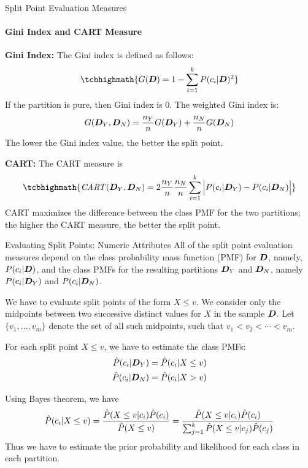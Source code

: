 \begin{frame}{Split Point Evaluation Measures}
\framesubtitle{Gini Index and CART Measure}

{\bf Gini Index:}
The Gini index is def\/{i}ned as follows:
\begin{align*}
\tcbhighmath{
  G(\bD) = 1 - \sum_{i=1}^{k}{P(c_i|\bD)^2}
}
\end{align*}
If the partition is pure, then Gini index is $0$. 
The weighted Gini index is:
\begin{align*}
  G({\boldsymbol D}_Y,{\boldsymbol D}_N) = \frac{n_Y}{n}G({\boldsymbol D}_Y)+\frac{n_N}{n}G({\boldsymbol D}_N)
\end{align*}
The lower the Gini index
value, the better the split point.

\bigskip
{\bf CART: }
The CART measure is
\begin{align*}
\tcbhighmath{
  \mathit{CART}(\bD_Y,\bD_N) =
  2 \frac{n_Y}{n} \frac{n_N}{n}
  \sum_{i=1}^{k}{\Bigl|P(c_i|\bD_Y)-P(c_i|\bD_N)\Bigr|}
}
\end{align*}
CART maximizes the
difference between the class PMF for the two partitions; the higher the CART measure, the better the
split point.
\end{frame}



\begin{frame}{Evaluating Split Points: Numeric Attributes}
All of the
split point evaluation measures depend on the class probability mass function (PMF) for ${\boldsymbol D}$,
namely, $P(c_i | {\boldsymbol D})$, and the class PMFs for the resulting
partitions ${\boldsymbol D}_Y$ and ${\boldsymbol D}_N$, namely $P(c_i | {\boldsymbol D}_Y)$ and
$P(c_i| {\boldsymbol D}_N)$. 

\medskip
We have to evaluate split points of
the form $X \le v$. We consider only the
midpoints between two successive distinct values for $X$ in the
sample ${\boldsymbol D}$. 
Let $\{v_1, \ldots, v_m\}$ denote the set of all such midpoints,
such that $v_1 < v_2 < \cdots < v_m$. 

\medskip
For each split point $X \le
v$, we have to estimate the class PMFs:
\begin{align*}
  \hat{P}(c_i|{\boldsymbol D}_Y) & = \hat{P}(c_i | X \le v) \\
\hat{P}(c_i|{\boldsymbol D}_N) &= \hat{P}(c_i | X > v) 
\end{align*}

\medskip
Using 
Bayes theorem, we have
\begin{align*}
  \hat{P}(c_i | X \le v) = \frac{\hat{P}(X \le v|c_i) \hat{P}(c_i)}{\hat{P}(X \le v)}
  = \frac{\hat{P}(X \le v|c_i) \hat{P}(c_i)}{\sum_{j=1}^k\hat{P}(X \le v|c_{j}) \hat{P}(c_{j})}
\end{align*}
Thus we have to estimate the prior probability and likelihood for each
class in each partition.
\end{frame}



